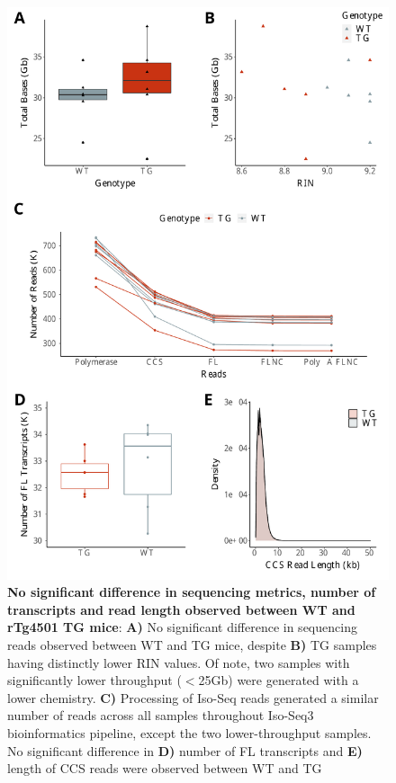 \begin{figure}[htp]
	\begin{center}
		\includegraphics[page=1,trim={0 0 0 0},clip,scale = 0.55]{Figures/rTg4510WholeTranscriptome.pdf}
	\end{center}
	\captionsetup{width=0.95\textwidth}
	\caption[Sequencing and data processing metrics of rTg4510 mice]%
	{\textbf{No significant difference in sequencing metrics, number of transcripts and read length observed between WT and rTg4501 TG mice}: \textbf{A)} No significant difference in sequencing reads observed between WT and TG mice, despite \textbf{B)} TG samples having distinctly lower RIN values. Of note, two samples with significantly lower throughput ($<$25Gb) were generated with a lower chemistry. \textbf{C)} Processing of Iso-Seq reads generated a similar number of reads across all samples throughout Iso-Seq3 bioinformatics pipeline, except the two lower-throughput samples. No significant difference in \textbf{D)} number of FL transcripts and \textbf{E)} length of CCS reads were observed between WT and TG}
	\label{fig:rTg4510_sequencing_metrics}
\end{figure}


